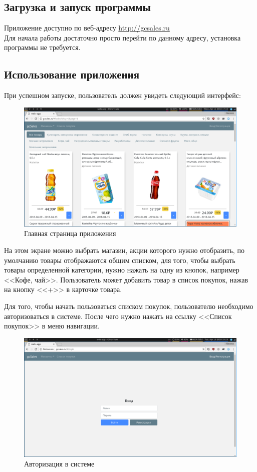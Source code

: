 \subsection{Загрузка и запуск программы}
Приложение доступно по веб-адресу \url{http://gcsales.ru}\\
Для начала работы достаточно просто перейти по данному адресу, установка
программы не требуется.

\subsection{Использование приложения}
При успешном запуске, пользователь должен увидеть следующий интерфейс:
\begin{figure}[H]
    \centering
    \includegraphics[width=\textwidth]{./screenshots/interface_main.png}
    \caption{Главная страница приложения}
\end{figure}
На этом экране можно выбрать магазин, акции которого нужно отобразить, по
умолчанию товары отображаются общим списком, для того, чтобы выбрать товары
определенной категории, нужно нажать на одну из кнопок, например <<Кофе, чай>>.
Пользователь может добавить товар в список покупок, нажав на кнопку <<+>> в
карточке товара.

Для того, чтобы начать пользоваться списком покупок, пользователю необходимо
авторизоваться в системе. После чего нужно нажать на ссылку <<Список покупок>>
в меню навигации.
\begin{figure}[H]
    \centering
    \includegraphics[width=\textwidth]{./screenshots/login.png}
    \caption{Авторизация в системе}
\end{figure}

